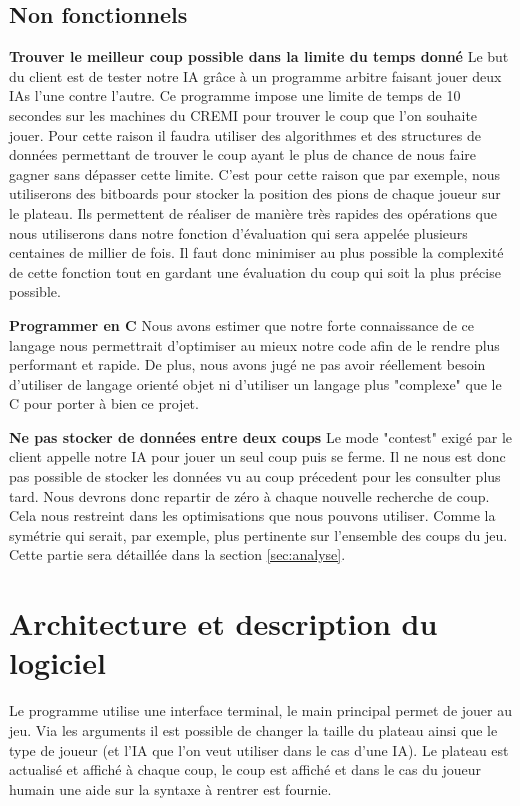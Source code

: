 \documentclass[12pt]{article}
\begin{document}
\subsection{Non fonctionnels}

\textbf{Trouver le meilleur coup possible dans la limite du temps donné}
Le but du client est de tester notre IA grâce à un programme arbitre faisant jouer deux IAs l'une contre l'autre. Ce programme impose une limite de temps de 10 secondes sur les machines du CREMI pour trouver le coup que l'on souhaite jouer. Pour cette raison il faudra utiliser des algorithmes et des structures de données permettant de trouver le coup ayant le plus de chance de nous faire gagner sans dépasser cette limite. C'est pour cette raison que par exemple, nous utiliserons des bitboards\cite{bitboard} pour stocker la position des pions de chaque joueur sur le plateau. Ils permettent de réaliser de manière très rapides des opérations que nous utiliserons dans notre fonction d'évaluation qui sera appelée plusieurs centaines de millier de fois. Il faut donc minimiser au plus possible la complexité de cette fonction tout en gardant une évaluation du coup qui soit la plus précise possible.

\textbf{Programmer en C} Nous avons estimer que notre forte connaissance de ce langage nous permettrait d'optimiser au mieux notre code afin de le rendre plus performant et rapide. De plus, nous avons jugé ne pas avoir réellement besoin d'utiliser de langage orienté objet ni d'utiliser un langage plus "complexe" que le C pour porter à bien ce projet.

\textbf{Ne pas stocker de données entre deux coups} Le mode "contest" exigé par le client appelle notre IA pour jouer un seul coup puis se ferme. Il ne nous est donc pas possible de stocker les données vu au coup précedent pour les consulter plus tard. Nous devrons donc repartir de zéro à chaque nouvelle recherche de coup. Cela nous restreint dans les optimisations que nous pouvons utiliser. Comme la symétrie qui serait, par exemple, plus pertinente sur l'ensemble des coups du jeu. Cette partie sera détaillée dans la section \ref{sec:analyse}.


\section{Architecture et description du logiciel}

Le programme utilise une interface terminal, le main principal permet de jouer au jeu. Via les arguments il est possible de changer la taille du plateau ainsi que le type de joueur (et l'IA que l'on veut utiliser dans le cas d'une IA). Le plateau est actualisé et affiché à chaque coup, le coup est affiché et dans le cas du joueur humain une aide sur la syntaxe à rentrer est fournie.
\end{document}
